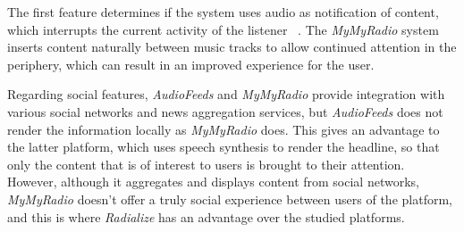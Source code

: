 \begin{table}[]
\centering
{}
\caption{Summary of the analyzed interactive radio and calm computing platforms}
\label{tab:irfeatures}
\end{table}

The first feature determines if the system uses audio as notification of content, which interrupts the current activity of the listener ~\cite{Dingler2010}. The \textit{MyMyRadio} system inserts content naturally between music tracks to allow continued attention in the periphery, which can result in an improved experience for the user.

Regarding social features, \textit{AudioFeeds} and \textit{MyMyRadio} provide integration with various social networks and news aggregation services, but \textit{AudioFeeds} does not render the information locally as \textit{MyMyRadio} does. This gives an advantage to the latter platform, which uses speech synthesis to render the headline, so that only the content that is of interest to users is brought to their attention. ~\cite{Aylett2015} However, although it aggregates and displays content from social networks, \textit{MyMyRadio} doesn't offer a truly social experience between users of the platform, and this is where \textit{Radialize} has an advantage over the studied platforms.

